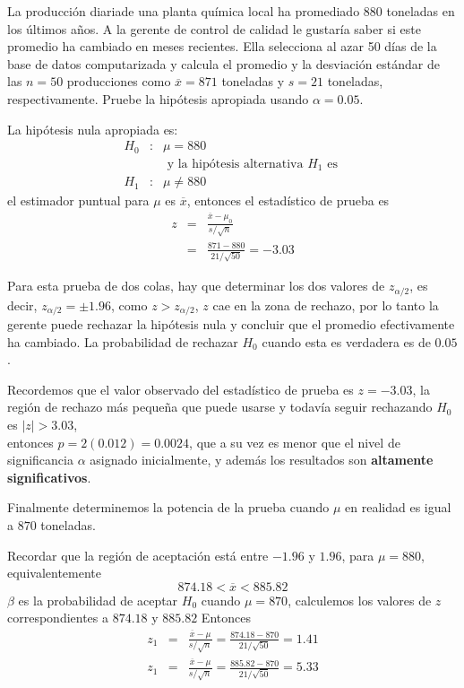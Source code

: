 \begin{Ejem}
La producci\'on diariade una planta qu\'imica local ha promediado 880 toneladas en los \'ultimos a\~nos. A la gerente de control de calidad le gustar\'ia saber si este promedio ha cambiado en meses recientes. Ella selecciona al azar 50 d\'ias de la base de datos computarizada y calcula el promedio y la desviaci\'on est\'andar de las $n=50$  producciones como $\overline{x}=871$ toneladas y $s=21$ toneladas, respectivamente. Pruebe la hip\'otesis  apropiada usando $\alpha=0.05$.

La hip\'otesis nula apropiada es:
\begin{eqnarray*}
H_{0}&:& \mu=880\\
&&\textrm{ y la hip\'otesis alternativa }H_{1}\textrm{ es }\\
H_{1}&:& \mu\neq880
\end{eqnarray*}
el estimador puntual para $\mu$ es $\overline{x}$, entonces el estad\'istico de prueba es
\begin{eqnarray*}
z&=&\frac{\overline{x}-\mu_{0}}{s/\sqrt{n}}\\
&=&\frac{871-880}{21/\sqrt{50}}=-3.03
\end{eqnarray*}

Para esta prueba de  dos colas, hay que determinar los dos valores de $z_{\alpha/2}$, es decir,  $z_{\alpha/2}=\pm1.96$, como $z>z_{\alpha/2}$, $z$  cae en la zona de rechazo, por lo tanto  la gerente puede rechazar la hip\'otesis nula y concluir que el promedio efectivamente ha cambiado.\medskip
La probabilidad de rechazar $H_{0}$ cuando esta es verdadera es de  $0.05$.


Recordemos que el valor observado del estad\'istico de prueba es $z=-3.03$, la regi\'on de rechazo m\'as peque\~na que puede usarse y todav\'ia seguir rechazando $H_{0}$ es $|z|>3.03$, \\
entonces $p=2(0.012)=0.0024$, que a su vez es menor que el nivel de significancia $\alpha$ asignado inicialmente, y adem\'as los resultados son  \textbf{altamente significativos}.

Finalmente determinemos la potencia de la prueba cuando $\mu$ en realidad es igual a $870$ toneladas.

Recordar que la regi\'on de aceptaci\'on est\'a entre $-1.96$ y $1.96$, para $\mu=880$, equivalentemente $$874.18<\overline{x}<885.82$$
$\beta$ es la probabilidad de aceptar $H_{0}$ cuando $\mu=870$, calculemos los valores de $z$ correspondientes a $874.18$ y $885.82$ \medskip
Entonces
\begin{eqnarray*}
z_{1}&=&\frac{\overline{x}-\mu}{s/\sqrt{n}}=\frac{874.18-870}{21/\sqrt{50}}=1.41\\
z_{1}&=&\frac{\overline{x}-\mu}{s/\sqrt{n}}=\frac{885.82-870}{21/\sqrt{50}}=5.33
\end{eqnarray*}


\end{Ejem}
